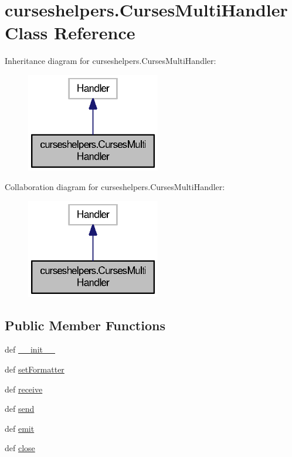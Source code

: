 \section{curseshelpers.\-Curses\-Multi\-Handler Class Reference}
\label{classcurseshelpers_1_1CursesMultiHandler}


Inheritance diagram for curseshelpers.\-Curses\-Multi\-Handler\-:
\nopagebreak
\begin{figure}[H]
\begin{center}
\leavevmode
\includegraphics[width=166pt]{classcurseshelpers_1_1CursesMultiHandler__inherit__graph}
\end{center}
\end{figure}


Collaboration diagram for curseshelpers.\-Curses\-Multi\-Handler\-:
\nopagebreak
\begin{figure}[H]
\begin{center}
\leavevmode
\includegraphics[width=166pt]{classcurseshelpers_1_1CursesMultiHandler__coll__graph}
\end{center}
\end{figure}
\subsection*{Public Member Functions}
\begin{DoxyCompactItemize}
\item 
def \hyperlink{classcurseshelpers_1_1CursesMultiHandler_a6c2e57f2c3dd117dd4bf5a52696341a6}{\-\_\-\-\_\-init\-\_\-\-\_\-}
\item 
def \hyperlink{classcurseshelpers_1_1CursesMultiHandler_abf074a0394305a171df1303c2081baa1}{set\-Formatter}
\item 
def \hyperlink{classcurseshelpers_1_1CursesMultiHandler_a046f6d9813f574859b8d6aebc5329492}{receive}
\item 
def \hyperlink{classcurseshelpers_1_1CursesMultiHandler_acbc92782779c711d78735310c59581f4}{send}
\item 
def \hyperlink{classcurseshelpers_1_1CursesMultiHandler_aa20416a41cb8ccc1dcdd90170cd2f73c}{emit}
\item 
def \hyperlink{classcurseshelpers_1_1CursesMultiHandler_a5bcc921fa090f828a4905185cc6b7660}{close}
\end{DoxyCompactItemize}
